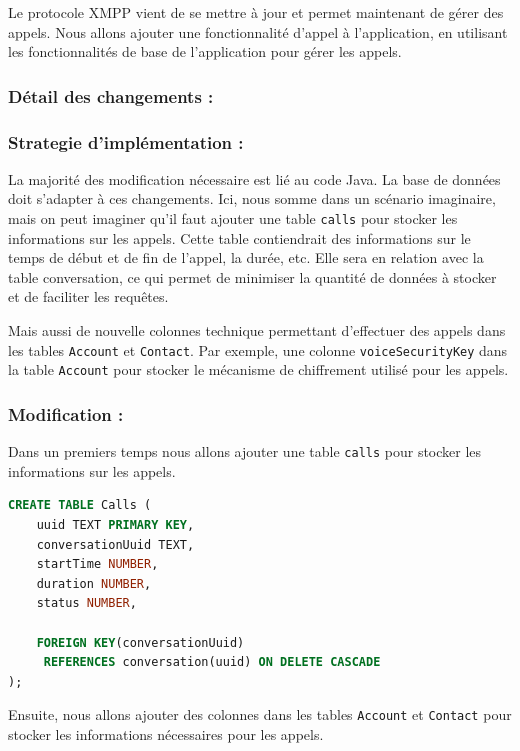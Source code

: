 \documentclass[a4paper,11pt]{article}
\begin{document}
Le protocole XMPP vient de se mettre à jour et permet maintenant de gérer des appels. Nous allons ajouter une fonctionnalité d'appel à l'application, en utilisant les fonctionnalités de base de l'application pour gérer les appels.

\subsubsection*{Détail des changements :}

\subsubsection*{Strategie d'implémentation :}

La majorité des modification nécessaire est lié au code Java. La base de données doit s'adapter à ces changements. Ici, nous somme dans un scénario imaginaire, mais on peut imaginer qu'il faut ajouter une table \texttt{calls} pour stocker les informations sur les appels. Cette table contiendrait des informations sur le temps de début et de fin de l'appel, la durée, etc. Elle sera en relation avec la table conversation, ce qui permet de minimiser la quantité de données à stocker et de faciliter les requêtes.

Mais aussi de nouvelle colonnes technique permettant d'effectuer des appels dans les tables \texttt{Account} et \texttt{Contact}. Par exemple, une colonne \texttt{voiceSecurityKey} dans la table \texttt{Account} pour stocker le mécanisme de chiffrement utilisé pour les appels. 

\subsubsection*{Modification :}

Dans un premiers temps nous allons ajouter une table \texttt{calls} pour stocker les informations sur les appels.

\begin{lstlisting}[language=SQL]
CREATE TABLE Calls (
	uuid TEXT PRIMARY KEY,
	conversationUuid TEXT,
	startTime NUMBER,
	duration NUMBER,
	status NUMBER,

	FOREIGN KEY(conversationUuid) 
	 REFERENCES conversation(uuid) ON DELETE CASCADE
);
\end{lstlisting}

Ensuite, nous allons ajouter des colonnes dans les tables \texttt{Account} et \texttt{Contact} pour stocker les informations nécessaires pour les appels.
\end{document}
